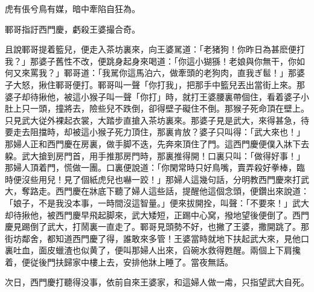 虎有倀兮鳥有媒，暗中牽陷自狂為。

鄆哥指訏西門慶，虧殺王婆撮合奇。

且說鄆哥提着籃兒，便走入茶坊裏來，向王婆駡道：「老猪狗！你昨日為甚麽便打我？」那婆子舊性不改，便跳身起身來喝道：「你這小猢猻！老娘與你無干，你如何又來罵我？」鄆哥道：「我駡你這馬泊六，做牽頭的老狗肉，直我ぎ䯲！」那婆子大怒，揪住鄆哥便打。鄆哥叫一聲「你打我」，把那手中籃兒丟出當街上來。那婆子却待揪他，被這小猴子叫一聲「你打」時，就打王婆腰裏帶個住，看着婆子小肚上只一頭，撞將去，險些兒不跌倒，卻得壁子礙住不倒。那猴子死命頂在壁上。只見武大従外裸起衣裳，大踏步直搶入茶坊裏來。那婆子見是武大，來得甚急，待要走去阻擋時，却被這小猴子死力頂住，那裏肯放？婆子只叫得：「武大來也！」那婦人正和西門慶在房裏，做手脚不迭，先奔來頂住了門。這西門慶便僕入牀下去躱。武大搶到房門首，用手推那房門時，那裏推得開！口裏只叫：「做得好事！」那婦人頂着門，慌做一團。口裏便說道：「你閑常時只好鳥嘴，賣弄殺好拳棒，臨時便沒些用兒！見了個紙虎兒也嚇一跤！」那婦人這幾句話，分明教西門慶來打武大，奪路走。西門慶在牀底下聽了婦人這些話，提醒他這個念頭，便鑽出來說道：「娘子，不是我没本事，一時間沒這智量。」便來拔開拴，叫聲：「不要來！」武大却待揪他，被西門慶早飛起脚來，武大矮短，正踢中心窝，撥地望後便倒了。西門慶見踢倒了武大，打鬧裏一直走了。鄆哥見頭勢不好，也撇了王婆，撒開跳了。那街坊鄰舍，都知道西門慶了得，誰敢來多管！王婆當時就地下扶起武大來，見他口裏吐血，面皮蠟渣也似黄了，便叫那婦人出來，舀碗水救得甦醒。兩個上下肩攙着，便従後門扶歸家中樓上去，安排他牀上睡了。當夜無話。

次日，西門慶打聽得没事，依前自來王婆家，和這婦人做一䖏，只指望武大自死。

